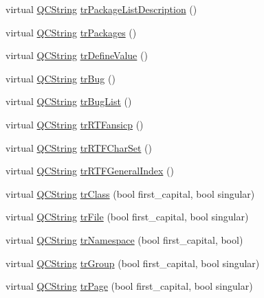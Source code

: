 \begin{DoxyCompactItemize}
virtual \hyperlink{class_q_c_string}{Q\-C\-String} \hyperlink{class_translator_indonesian_aafd776ddbb24f5b3cf7c2f39c80f8652}{tr\-Package\-List\-Description} ()
\item 
virtual \hyperlink{class_q_c_string}{Q\-C\-String} \hyperlink{class_translator_indonesian_a5b648094fc927e3078e9af28c26f8bba}{tr\-Packages} ()
\item 
virtual \hyperlink{class_q_c_string}{Q\-C\-String} \hyperlink{class_translator_indonesian_ae6be6e403011f5b069dde07447839f9e}{tr\-Define\-Value} ()
\item 
virtual \hyperlink{class_q_c_string}{Q\-C\-String} \hyperlink{class_translator_indonesian_abfa1d6c97f4c2967ebbd515db5590ec6}{tr\-Bug} ()
\item 
virtual \hyperlink{class_q_c_string}{Q\-C\-String} \hyperlink{class_translator_indonesian_a6922767c9b6ff214503967c6f8b66468}{tr\-Bug\-List} ()
\item 
virtual \hyperlink{class_q_c_string}{Q\-C\-String} \hyperlink{class_translator_indonesian_ac711f1a109c3c8131bf02a9ff6f48e36}{tr\-R\-T\-Fansicp} ()
\item 
virtual \hyperlink{class_q_c_string}{Q\-C\-String} \hyperlink{class_translator_indonesian_af3bba50fd4e382b113171e132e88719b}{tr\-R\-T\-F\-Char\-Set} ()
\item 
virtual \hyperlink{class_q_c_string}{Q\-C\-String} \hyperlink{class_translator_indonesian_a6a04ffa0f1114981e258cf0a94478c98}{tr\-R\-T\-F\-General\-Index} ()
\item 
virtual \hyperlink{class_q_c_string}{Q\-C\-String} \hyperlink{class_translator_indonesian_a2b5bc0be4e846d4ee6e3430ddeb3cf53}{tr\-Class} (bool first\-\_\-capital, bool singular)
\item 
virtual \hyperlink{class_q_c_string}{Q\-C\-String} \hyperlink{class_translator_indonesian_abb09819793310c18e4b39a4691b8e681}{tr\-File} (bool first\-\_\-capital, bool singular)
\item 
virtual \hyperlink{class_q_c_string}{Q\-C\-String} \hyperlink{class_translator_indonesian_a8051c9030258613d31e99e638817a377}{tr\-Namespace} (bool first\-\_\-capital, bool)
\item 
virtual \hyperlink{class_q_c_string}{Q\-C\-String} \hyperlink{class_translator_indonesian_a2825eb7956ddf759028c8957352e627d}{tr\-Group} (bool first\-\_\-capital, bool singular)
\item 
virtual \hyperlink{class_q_c_string}{Q\-C\-String} \hyperlink{class_translator_indonesian_a719e433b483932299fd17e751decdfb2}{tr\-Page} (bool first\-\_\-capital, bool singular)

\end{DoxyCompactItemize}
